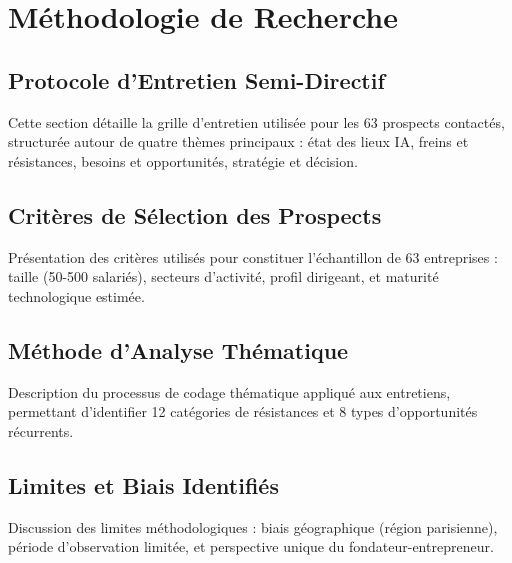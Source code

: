 \chapter{Méthodologie de Recherche}
\label{app:methodologie}

\section{Protocole d'Entretien Semi-Directif}
Cette section détaille la grille d'entretien utilisée pour les 63 prospects contactés, structurée autour de quatre thèmes principaux : état des lieux IA, freins et résistances, besoins et opportunités, stratégie et décision.

\section{Critères de Sélection des Prospects}
Présentation des critères utilisés pour constituer l'échantillon de 63 entreprises : taille (50-500 salariés), secteurs d'activité, profil dirigeant, et maturité technologique estimée.

\section{Méthode d'Analyse Thématique}
Description du processus de codage thématique appliqué aux entretiens, permettant d'identifier 12 catégories de résistances et 8 types d'opportunités récurrents.

\section{Limites et Biais Identifiés}
Discussion des limites méthodologiques : biais géographique (région parisienne), période d'observation limitée, et perspective unique du fondateur-entrepreneur.
